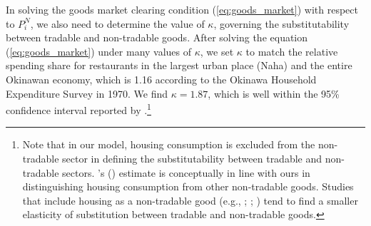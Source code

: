 \documentclass[12pt, unicode, a4paper]{article}
\newcommand{\1}{\mbox{1}\hspace{-0.25em}\mbox{l}} %
\begin{document}
In solving the goods market clearing condition (\ref{eq:goods_market}) with respect to $P_i^N$, we also need to determine the value of $\kappa$, governing the substitutability between tradable and non-tradable goods. After solving the equation (\ref{eq:goods_market}) under many values of $\kappa$, we set $\kappa$ to match the relative spending share for restaurants in the largest urban place (Naha) and the entire Okinawan economy, which is 1.16 according to the Okinawa Household Expenditure Survey in 1970. We find $\kappa=1.87$, which is well within the 95\% confidence interval reported by \cite{hobijn2019sticker}.\footnote{
Note that in our model, housing consumption is excluded from the non-tradable sector in defining the substitutability between tradable and non-tradable sectors. \citeauthor{hobijn2019sticker}'s (\citeyear{hobijn2019sticker}) estimate is conceptually in line with ours in distinguishing housing consumption from other non-tradable goods. Studies that include housing as a non-tradable good (e.g., \citealt{duarte2010structural}; \citealt{fajgelbaum2022argentina}; \citealt{buera2022structural}) tend to find a smaller elasticity of substitution between tradable and non-tradable goods. 
} 
\end{document}
